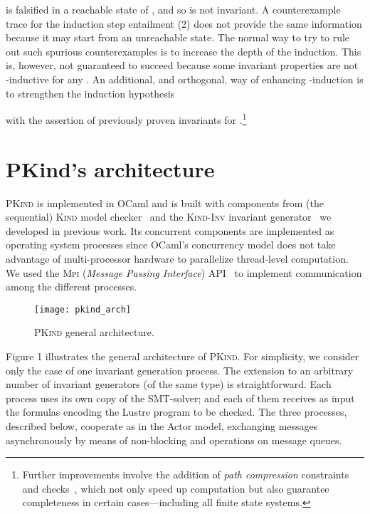 \documentclass[submission,copyright,creativecommons]{eptcs}
\newcommand{\Kind}{\textrm{\textsc{Kind}}\xspace}
\newcommand{\KindInv}{\textrm{\textsc{Kind}-\textsc{Inv}}\xspace}
\newcommand{\PKind}{\textrm{\textsc{PKind}}\xspace}
\newcommand{\Mpi}{\textrm{\textsc{Mpi}}\xspace}
\begin{document}
is falsified in a reachable state of , 
and so is not invariant. 
A counterexample trace for the induction step entailment (2) does not
provide the same information because it may start from an unreachable state.  
The normal way to try to rule out such spurious counterexamples is 
to increase the depth  of the induction.  This is, however, 
not guaranteed to succeed because some invariant properties are not
-inductive for any .  
An additional, and orthogonal, way of enhancing -induction is 
to strengthen the induction hypothesis 

with the assertion of previously proven invariants for .\footnote{
Further improvements involve the addition of \emph{path compression}
constraints and checks~\cite{She00,deMRS-CAV-03},
which not only speed up computation 
but also guarantee completeness in certain cases---including all finite state systems.
}


\section{PKind's architecture}
 
\PKind is implemented in OCaml and is built with components from
(the sequential) \Kind model checker~\cite{hagen08} and the \KindInv invariant
generator~\cite{Kahsai-Ge-Tinelli-10} we developed in previous work.
Its concurrent components are implemented as operating system
processes since OCaml's concurrency model 
does not take advantage of multi-processor hardware to parallelize 
thread-level computation.  
We used the \Mpi
(\textit{Message Passing Interface}) API~\cite{mpi97} to implement
communication among the different processes.

\begin{figure}[t] \centering
\texttt{[image: pkind\_arch]} 
\caption{
\PKind general architecture.
}
\label{fig:pkind_arch}
\end{figure}


Figure 1 
illustrates the general architecture of
\PKind.  For simplicity, we consider only the case of one invariant
generation process.  The extension to an arbitrary number of invariant
generators (of the same type) is straightforward.  Each process uses
its own copy of the SMT-solver; and each of them receives as input the
formulas encoding the Lustre program to be checked.  The three
processes, described below, cooperate as in the Actor model,
exchanging messages asynchronously by means of non-blocking
 and  operations on message queues.
\medskip
\end{document}
